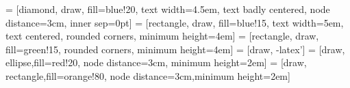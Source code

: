 \documentclass[11pt, a4paper]{article}\usepackage[]{graphicx}\usepackage[]{xcolor}
\begin{document}
\pagestyle{empty}
\footnotesize





\pagebreak



 = [diamond, draw, fill=blue!20, 
    text width=4.5em, text badly centered, node distance=3cm, inner sep=0pt]
 = [rectangle, draw, fill=blue!15, 
    text width=5em, text centered, rounded corners, minimum height=4em]
 = [rectangle, draw, fill=green!15, rounded corners, minimum height=4em]  
 = [draw, -latex']
 = [draw, ellipse,fill=red!20, node distance=3cm,
    minimum height=2em]
 = [draw, rectangle,fill=orange!80, node distance=3cm,minimum height=2em]
\end{document}
